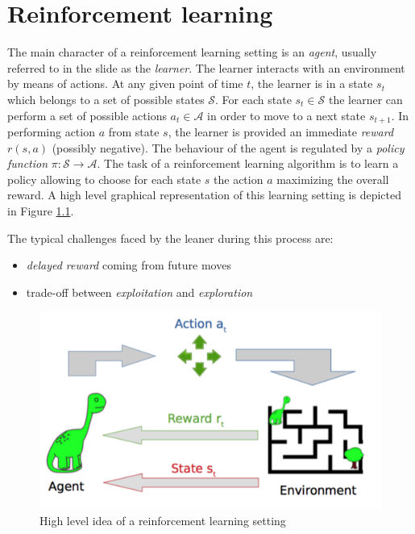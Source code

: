 \chapter{Reinforcement learning}
\label{cha:reinforcement}

The main character of a reinforcement learning setting is an \textit{agent}, usually referred to in the slide as the \textit{learner}. The learner interacts with an environment by means of actions. At any given point of time $t$, the learner is in a state $s_t$ which belongs to a set of possible states $\mathcal{S}$. For each state $s_t \in \mathcal{S}$ the learner can perform a set of possible actions $a_t \in \mathcal{A}$ in order to move to a next state $s_{t+1}$. In performing action $a$ from state $s$, the learner is provided an immediate \textit{reward} $r(s,a)$ (possibly negative). The behaviour of the agent is regulated by a \textit{policy function} $\pi: \mathcal{S} \rightarrow \mathcal{A}$. The task of a reinforcement learning algorithm is to learn a policy allowing to choose for each state $s$ the action $a$ maximizing the overall reward. A high level graphical representation of this learning setting is depicted in Figure \ref{fig:reinforcementLearning}. \newline

The typical challenges faced by the leaner during this process are:
\begin{itemize}
    \item \textit{delayed reward} coming from future moves
    \item trade-off between \textit{exploitation} and \textit{exploration}
\end{itemize}

\begin{figure}
    \centering
    \includegraphics[width=\textwidth]{images/reinforcementLearning.png}
    \caption{High level idea of a reinforcement learning setting}
    \label{fig:reinforcementLearning}
\end{figure}

